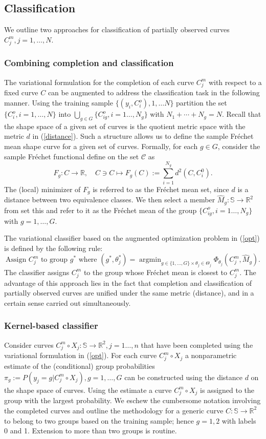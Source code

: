 \documentclass[11pt]{amsart}
\newcommand{\C}{C}
\newcommand{\Rtwo}{\mathbb{R}^2}
\newcommand{\uc}{\mathbb{S}}
\DeclareMathOperator*{\argmin}{argmin}
\theoremstyle{definition}
\begin{document}
\subsection{Classification}
We outline two approaches for classification of partially observed curves $C^m_j, j=1,\ldots,N$. 
\subsubsection{Combining completion and classification}
The variational formulation for the completion of each curve $C^m_j$ with respect to a fixed curve $C$ can be augmented to address the classification task in the following manner. Using the training sample $\{(y_i,\C^o_i),1,\ldots N\}$ partition the set $\{C^o_i, i=1,\ldots,N\}$ into $\bigcup_{g \in G}\{C^o_{ig}, i=1\ldots,N_g\}$ with $N_1+\cdots+N_g=N$. Recall that the shape space of a given set of curves is the quotient metric space with the metric $d$ in (\ref{distance}). Such a structure allows us to define the sample Fr\'{e}chet mean shape curve for a given set of curves. Formally, for each $g \in G$, consider the sample Fr\'{e}chet functional define on the set $\mathcal{C}$ as
$$F_g:C \to \mathbb{R}, \quad  C \ni C  \mapsto F_g(C):= \sum_{i=1}^{N_g} d^2(C,C_i^0).$$
The (local) minimizer of $F_g$ is referred to as the Fr\'{e}chet mean set, since $d$ is a distance between two equivalence classes. We then select a member $\hat{M}_g:\uc \to \Rtwo$ from set this and refer to it as the Fr\'{e}chet mean of the group $\{C^o_{ig}, i=1\ldots,N_g\}$ with $g =1,\ldots,G$. 

The variational classifier based on the augmented optimization problem in (\ref{opt}) is defined by the following rule:
\[
\text{Assign $C^m_j$ to group $g^*$ where }  (g^*,\theta^*_j)= \argmin_{g \in \{1,\ldots,G\} \times \theta_j \in \Theta_j} \Phi_{\theta_j}(C^m_j,\hat{M}_g).
\]
The classifier assigns $C^m_j$ to the group whose Fr\'{e}chet mean is closest to $C^m_j$. The advantage of this approach lies in the fact that completion and classification of partially observed curves are unified under the same metric (distance), and in a certain sense carried out simultaneously.  

\subsubsection{Kernel-based classifier}
Consider curves $C_j^m\circ X_j: \uc \to \Rtwo, j=1\ldots,n$ that have been completed using the variational formulation in (\ref{opt}). For each curve $C^m_j \circ X_j$ a nonparametric estimate of the (conditional) group probabilities $\pi_g:=P(y_j=g|C_j^m \circ X_j),g=1,\ldots,G$ can be constructed using the distance $d$ on the shape space of curves. Using the estimate a curve $C_j^m\circ X_j$ is assigned to the group with the largest probability. We eschew the cumbersome notation involving the completed curves and outline the methodology for a generic curve $C:\uc \to \Rtwo$ to belong to two groups based on the training sample; hence $g=1,2$ with labels 0 and 1. Extension to more than two groups is routine. 
\end{document}
